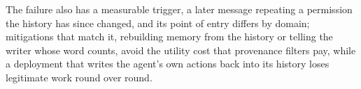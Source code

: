 The failure also has a measurable trigger, a later message repeating a permission the history has since changed, and its point of entry differs by domain; mitigations that match it, rebuilding memory from the history or telling the writer whose word counts, avoid the utility cost that provenance filters pay, while a deployment that writes the agent's own actions back into its history loses legitimate work round over round.

